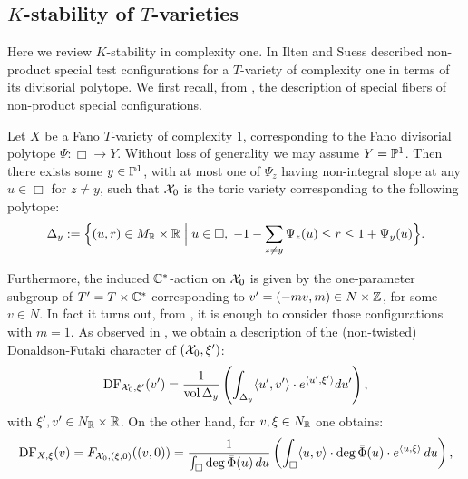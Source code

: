 \subsection{$K$-stability of $T$-varieties} \label{subsec:IS}
Here we review \(K\)-stability in complexity one. In \cite{ilten2015} Ilten and Suess described non-product special test configurations for a \(T\)-variety of complexity one in terms of its divisorial polytope. We first recall, from \cite{ilten2015}, the description of special fibers of non-product special configurations.

Let \(X\) be a Fano \(T\)-variety of complexity \(1\), corresponding to the Fano divisorial polytope \(\Psi : \Box \to Y\). Without loss of generality we may assume \(Y = \mathbb{P}^1\). Then there exists some \(y \in \mathbb{P}^1\), with at most one of \(\Psi_z\) having non-integral slope at any \(u \in \Box\) for \(z \neq y\), such that \({\mathcal{X}}_0\) is the toric variety corresponding to the following polytope:
\begin{equation*}
\Delta_y := \Big\{(u,r) \in M_{\mathbb{R}} \times \mathbb{R} \; \Big| \; u \in \Box,\; -1-\sum_{z \neq y} \Psi_z(u) \leq r \leq 1+\Psi_y(u)\Big\}.\label{eq:special-fibre}
\end{equation*}

Furthermore, the induced \(\mathbb{C}^*\)-action on \({\mathcal{X}}_0\) is given by the one-parameter subgroup of 
 \(T' = T \times \mathbb{C}^*\) corresponding to \(v'=(-mv,m) \in N \times \mathbb{Z}\), for some \(v \in N\). In fact it turns out, from \cite{ilten2015}, it is enough to consider those configurations with \(m=1\). As observed in \cite{ilten2015}, we obtain a description of the (non-twisted) Donaldson-Futaki character of $({\mathcal{X}}_0,\xi')$:
\begin{equation}
\mathop{\rm DF}\nolimits_{{\mathcal{X}}_0, \xi'}(v') = \frac{1}{\mathop{\rm vol}\nolimits \Delta_y}\left(\int_{\Delta_y} \langle u', v' \rangle \cdot e^{\langle u', \xi'\rangle} du'\right),\label{eq:futaki-character}
\end{equation}
with $\xi',v' \in N_{\mathbb{R}} \times \mathbb{R}$. On the other hand, for $v,\xi \in N_{\mathbb{R}}$ one obtains:
\begin{equation}
\mathop{\rm DF}\nolimits_{X, \xi}(v) = F_{{\mathcal{X}}_0, (\xi,0)}((v,0))
= \frac{1}{\int_\Box \deg \bar \Phi(u) \,du }\left(\int_{\Box} \langle u, v \rangle \cdot \deg \bar \Phi(u) \cdot e^{\langle u, \xi \rangle}\, du\right)
, \label{eq:futaki-general-fibre}
\end{equation}